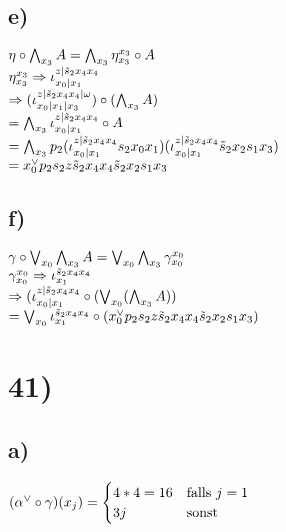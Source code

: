 \documentclass[11pt]{amsart}
\begin{document}
\subsection*{e)}
$\eta \circ \bigwedge_{x_3}A = \bigwedge_{x_3} \eta^{x_3}_{x_3} \circ A$ \\
$\eta^{x_3}_{x_3} \Rightarrow \iota^{z|\tilde s_2x_4x_4}_{x_0|x_1}$ \\
$\Rightarrow (\iota_{x_0|x_1|x_3}^{z|\tilde s_2x_4 x_4|\omega}) \circ (\bigwedge_{x_3}A)$ \\
$= \bigwedge_{x_3}\iota^{z|\tilde s_2x_4x_4}_{x_0|x_1} \circ A$ \\
$= \bigwedge_{x_3}p_2(\iota^{z|\tilde s_2x_4x_4}_{x_0|x_1}s_2x_0x_1)(\iota^{z|\tilde s_2x_4x_4}_{x_0|x_1}\tilde s_2 x_2 s_1 x_3)$ \\
$= x_0^{\vee}p_2s_2z\tilde s_2x_4x_4 \tilde s_2x_2s_1x_3$ \\
\subsection*{f)}
$\gamma \circ \bigvee_{x_0}\bigwedge_{x_3}A = \bigvee_{x_0}\bigwedge_{x_3} \gamma^{x_0}_{x_0}$ \\
$\gamma^{x_0}_{x_0} \Rightarrow \iota^{\tilde s_2 x_4 x_4}_{x_1}$ \\
$\Rightarrow (\iota^{z|\tilde s_2 x_4 x_4}_{x_0 | x_1} \circ (\bigvee_{x_0}(\bigwedge_{x_3}A))$ \\
$= \bigvee_{x_0} \iota^{\tilde s_2 x_4 x_4}_{x_1} \circ (x_0^{\vee}p_2s_2z\tilde s_2 x_4 x_4 \tilde s_2 x_2 s_1 x_3)$ \\

\section*{41)}
\subsection*{a)}
$(\alpha^{\vee} \circ \gamma) (x_j) = \begin{cases} 4*4 = 16 &\mbox{falls } j=1 \\ 3j &\mbox{sonst} \end{cases}$
\end{document}
